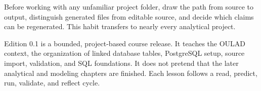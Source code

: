 \transferheading
Before working with any unfamiliar project folder, draw the path from source to
output, distinguish generated files from editable source, and decide which
claims can be regenerated. This habit transfers to nearly every analytical
project.

\begin{summarybox}
Edition 0.1 is a bounded, project-based course release. It teaches the OULAD
context, the organization of linked database tables, PostgreSQL setup, source
import, validation, and SQL foundations. It does not pretend that the later
analytical and modeling chapters are finished. Each lesson follows a read,
predict, run, validate, and reflect cycle.
\end{summarybox}
